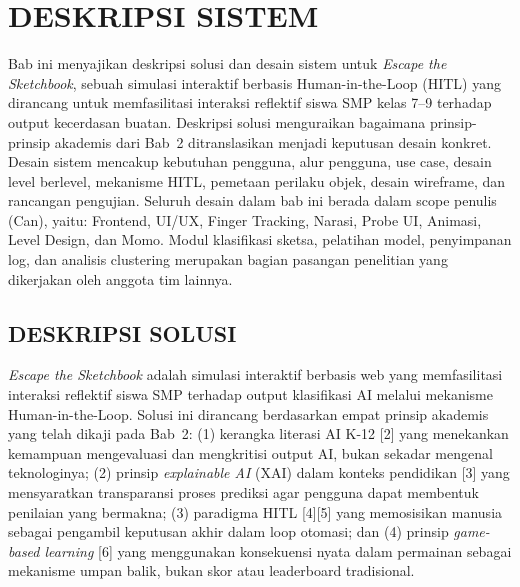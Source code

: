 
\chapter{DESKRIPSI SISTEM}
\label{chap:bab3}

Bab ini menyajikan deskripsi solusi dan desain sistem untuk \textit{Escape the Sketchbook}, sebuah simulasi interaktif berbasis Human-in-the-Loop (HITL) yang dirancang untuk memfasilitasi interaksi reflektif siswa SMP kelas 7--9 terhadap output kecerdasan buatan. Deskripsi solusi menguraikan bagaimana prinsip-prinsip akademis dari Bab~2 ditranslasikan menjadi keputusan desain konkret. Desain sistem mencakup kebutuhan pengguna, alur pengguna, use case, desain level berlevel, mekanisme HITL, pemetaan perilaku objek, desain wireframe, dan rancangan pengujian. Seluruh desain dalam bab ini berada dalam scope penulis (Can), yaitu: Frontend, UI/UX, Finger Tracking, Narasi, Probe UI, Animasi, Level Design, dan Momo. Modul klasifikasi sketsa, pelatihan model, penyimpanan log, dan analisis clustering merupakan bagian pasangan penelitian yang dikerjakan oleh anggota tim lainnya.


\section{DESKRIPSI SOLUSI}
\label{sec:deskripsi-solusi}

\textit{Escape the Sketchbook} adalah simulasi interaktif berbasis web yang memfasilitasi interaksi reflektif siswa SMP terhadap output klasifikasi AI melalui mekanisme Human-in-the-Loop. Solusi ini dirancang berdasarkan empat prinsip akademis yang telah dikaji pada Bab~2: (1) kerangka literasi AI K-12 [2] yang menekankan kemampuan mengevaluasi dan mengkritisi output AI, bukan sekadar mengenal teknologinya; (2) prinsip \textit{explainable AI} (XAI) dalam konteks pendidikan [3] yang mensyaratkan transparansi proses prediksi agar pengguna dapat membentuk penilaian yang bermakna; (3) paradigma HITL [4][5] yang memosisikan manusia sebagai pengambil keputusan akhir dalam loop otomasi; dan (4) prinsip \textit{game-based learning} [6] yang menggunakan konsekuensi nyata dalam permainan sebagai mekanisme umpan balik, bukan skor atau leaderboard tradisional.

